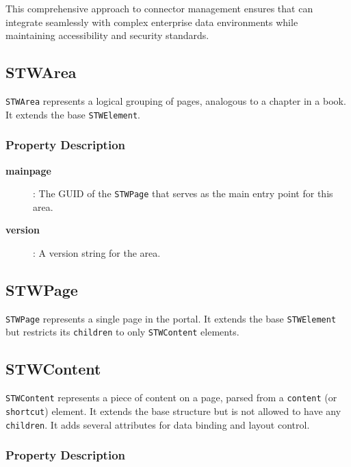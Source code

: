 This comprehensive approach to connector management ensures that \wbol{} can integrate seamlessly with complex enterprise data environments while maintaining accessibility and security standards.

\subsection{STWArea}

\texttt{STWArea} represents a logical grouping of pages, analogous to a chapter in a book. It extends the base \texttt{STWElement}.

\subsubsection{Property Description}

\begin{description}
\item[\textbf{mainpage}]: The GUID of the \texttt{STWPage} that serves as the main entry point for this area.
\item[\textbf{version}]: A version string for the area.
\end{description}

\subsection{STWPage}

\texttt{STWPage} represents a single page in the portal. It extends the base \texttt{STWElement} but restricts its \texttt{children} to only \texttt{STWContent} elements.

\subsection{STWContent}

\texttt{STWContent} represents a piece of content on a page, parsed from a \texttt{content} (or \texttt{shortcut}) element. It extends the base structure but is not allowed to have any \texttt{children}. It adds several attributes for data binding and layout control.

\subsubsection{Property Description}

